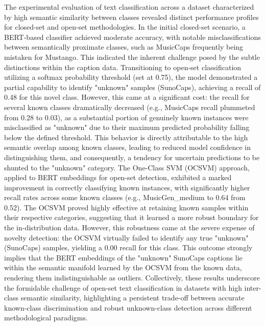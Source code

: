\documentclass[conference]{IEEEtran}  %
\begin{document}
The experimental evaluation of text classification across a dataset characterized by high semantic similarity between classes revealed distinct performance profiles for closed-set and open-set methodologies. In the initial closed-set scenario, a BERT-based classifier achieved moderate accuracy, with notable misclassifications between semantically proximate classes, such as MusicCaps frequently being mistaken for Mustango. This indicated the inherent challenge posed by the subtle distinctions within the caption data. Transitioning to open-set classification utilizing a softmax probability threshold (set at 0.75), the model demonstrated a partial capability to identify "unknown" samples (SunoCaps), achieving a recall of 0.48 for this novel class. However, this came at a significant cost: the recall for several known classes dramatically decreased (e.g., MusicCaps recall plummeted from 0.28 to 0.03), as a substantial portion of genuinely known instances were misclassified as "unknown" due to their maximum predicted probability falling below the defined threshold. This behavior is directly attributable to the high semantic overlap among known classes, leading to reduced model confidence in distinguishing them, and consequently, a tendency for uncertain predictions to be shunted to the "unknown" category. The One-Class SVM (OCSVM) approach, applied to BERT embeddings for open-set detection, exhibited a marked improvement in correctly classifying known instances, with significantly higher recall rates across some known classes (e.g., MusicGen\_medium to 0.64 from 0.52). The OCSVM proved highly effective at retaining known samples within their respective categories, suggesting that it learned a more robust boundary for the in-distribution data. However, this robustness came at the severe expense of novelty detection: the OCSVM virtually failed to identify any true "unknown" (SunoCaps) samples, yielding a 0.00 recall for this class. This outcome strongly implies that the BERT embeddings of the "unknown" SunoCaps captions lie within the semantic manifold learned by the OCSVM from the known data, rendering them indistinguishable as outliers. Collectively, these results underscore the formidable challenge of open-set text classification in datasets with high inter-class semantic similarity, highlighting a persistent trade-off between accurate known-class discrimination and robust unknown-class detection across different methodological paradigms.
\end{document}
